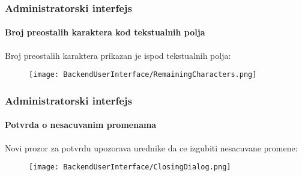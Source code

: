 \begin{frame}[fragile]
	\frametitle{Administratorski interfejs}
	\framesubtitle{Broj preostalih karaktera kod tekstualnih polja}

	Broj preostalih karaktera prikazan je ispod tekstualnih polja:

	\begin{figure}
		\texttt{[image: BackendUserInterface/RemainingCharacters.png]}
	\end{figure}

\end{frame}

\begin{frame}[fragile]
	\frametitle{Administratorski interfejs}
	\framesubtitle{Potvrda o nesacuvanim promenama}

	Novi prozor za potvrdu upozorava urednike da ce izgubiti nesacuvane promene:

	\begin{figure}
		\texttt{[image: BackendUserInterface/ClosingDialog.png]}
	\end{figure}

\end{frame}

